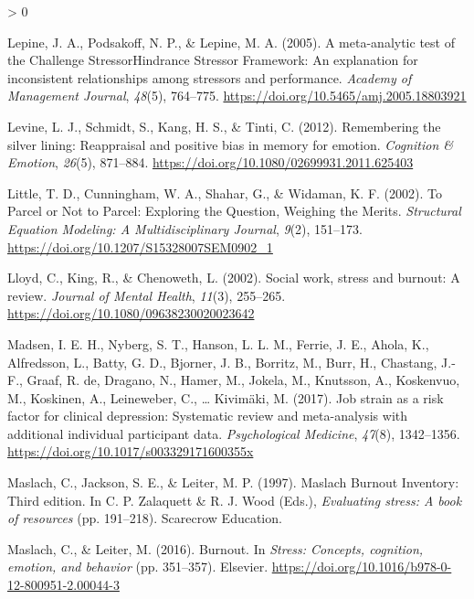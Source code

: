 \documentclass[
  english,
  man,floatsintext]{apa6}
\newlength{\cslhangindent}
\newenvironment{CSLReferences}[2] %
 {%
  \setlength{\parindent}{0pt}
  \ifodd #1 \everypar{\setlength{\hangindent}{\cslhangindent}}\ignorespaces\fi
  \ifnum #2 > 0
  \setlength{\parskip}{#2\baselineskip}
  \fi
 }%
 {}
\begin{document}
\begin{CSLReferences}{1}{0}
\leavevmode\hypertarget{ref-Lepine2005}{}%
Lepine, J. A., Podsakoff, N. P., \& Lepine, M. A. (2005). A meta-analytic test of the {C}hallenge {S}tressor{{}}{H}indrance {S}tressor {F}ramework: {A}n explanation for inconsistent relationships among stressors and performance. \emph{Academy of Management Journal}, \emph{48}(5), 764--775. \url{https://doi.org/10.5465/amj.2005.18803921}

\leavevmode\hypertarget{ref-Levine2012}{}%
Levine, L. J., Schmidt, S., Kang, H. S., \& Tinti, C. (2012). Remembering the silver lining: Reappraisal and positive bias in memory for emotion. \emph{Cognition {\&} Emotion}, \emph{26}(5), 871--884. \url{https://doi.org/10.1080/02699931.2011.625403}

\leavevmode\hypertarget{ref-Little2002}{}%
Little, T. D., Cunningham, W. A., Shahar, G., \& Widaman, K. F. (2002). To {Parcel} or {Not} to {Parcel}: {Exploring} the {Question}, {Weighing} the {Merits}. \emph{Structural Equation Modeling: A Multidisciplinary Journal}, \emph{9}(2), 151--173. \url{https://doi.org/10.1207/S15328007SEM0902_1}

\leavevmode\hypertarget{ref-Lloyd2002}{}%
Lloyd, C., King, R., \& Chenoweth, L. (2002). Social work, stress and burnout: A review. \emph{Journal of Mental Health}, \emph{11}(3), 255--265. \url{https://doi.org/10.1080/09638230020023642}

\leavevmode\hypertarget{ref-Madsen2017}{}%
Madsen, I. E. H., Nyberg, S. T., Hanson, L. L. M., Ferrie, J. E., Ahola, K., Alfredsson, L., Batty, G. D., Bjorner, J. B., Borritz, M., Burr, H., Chastang, J.-F., Graaf, R. de, Dragano, N., Hamer, M., Jokela, M., Knutsson, A., Koskenvuo, M., Koskinen, A., Leineweber, C., \ldots{} Kivimäki, M. (2017). Job strain as a risk factor for clinical depression: Systematic review and meta-analysis with additional individual participant data. \emph{Psychological Medicine}, \emph{47}(8), 1342--1356. \url{https://doi.org/10.1017/s003329171600355x}

\leavevmode\hypertarget{ref-Maslach1997}{}%
Maslach, C., Jackson, S. E., \& Leiter, M. P. (1997). Maslach {Burnout} {Inventory}: {Third} edition. In C. P. Zalaquett \& R. J. Wood (Eds.), \emph{Evaluating stress: A book of resources} (pp. 191--218). Scarecrow Education.

\leavevmode\hypertarget{ref-Maslach2016}{}%
Maslach, C., \& Leiter, M. (2016). Burnout. In \emph{Stress: Concepts, cognition, emotion, and behavior} (pp. 351--357). Elsevier. \url{https://doi.org/10.1016/b978-0-12-800951-2.00044-3}


\end{CSLReferences}
\end{document}
